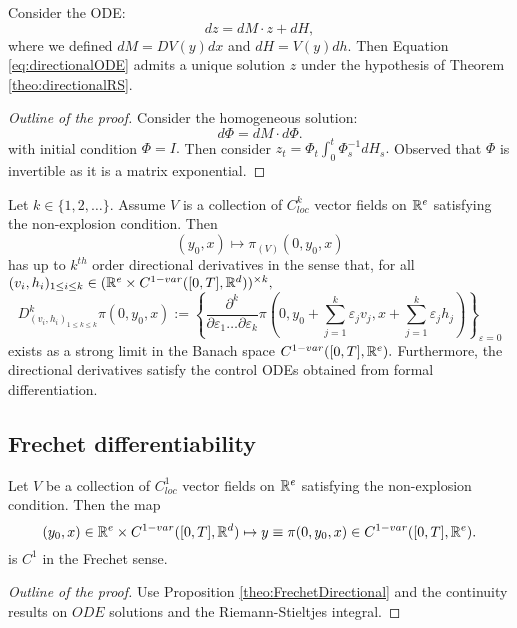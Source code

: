 \begin{proposition}
    Consider the ODE:
    \begin{equation}\label{eq:directionalODE}
        dz = dM \cdot z + dH, 
    \end{equation}
    where we defined $dM = DV(y) dx$ and $dH = V(y) dh.$
    Then Equation \eqref{eq:directionalODE} admits a unique solution $z$ under the hypothesis of Theorem \ref{theo:directionalRS}.
\end{proposition}
\begin{proof}[Outline of the proof]
    Consider the homogeneous solution:
    \begin{equation}
        d \Phi = dM \cdot d \Phi.
    \end{equation}
    with initial condition $\Phi = I.$
    Then consider $z_t = \Phi_t \int_0^t \Phi_s^{-1} dH_s.$
    Observed that $\Phi$ is invertible as it is a matrix exponential.
\end{proof}

\begin{proposition}
    Let $k \in \{ 1, 2, \ldots \}.$
    Assume $V$ is a collection of $C^k_{loc}$ vector fields on $\mathbb{R}^e$ satisfying the non-explosion condition. Then
    \begin{equation*}
        (y_0, x) \mapsto \pi_{(V)}(0, y_0, x)
    \end{equation*}
    has up to $k^{th}$ order directional derivatives in the sense that, for all $(v_i, h_i)_{1 \leq i \leq k} \in (\mathbb{R}^e \times C^{1-var}([0,T], \mathbb{R}^d))^{\times k},$
    \begin{equation*}
        D_{(v_i, h_i)_{1 \leq k \leq k}}^k \pi(0, y_0, x) := \left\{ \frac{\partial^k}{\partial \varepsilon_1 \ldots \partial \varepsilon_k} \pi \left( 0, y_0 + \sum_{j=1}^k \varepsilon_j v_j, x + \sum_{j=1}^k \varepsilon_j h_j \right) \right\}_{\varepsilon = 0}
    \end{equation*}
    exists as a strong limit in the Banach space $C^{1-var}([0,T], \mathbb{R}^e).$
    Furthermore, the directional derivatives satisfy the control ODEs obtained from formal differentiation.
\end{proposition}

\subsection{Frechet differentiability}

\begin{theorem}
    Let $V$ be a collection of $C^1_{loc}$ vector fields on $\mathbb{R}^e$ satisfying the non-explosion condition. Then the map
    \begin{equation}
        (y_0, x) \in \mathbb{R}^e \times C^{1-var}([0,T], \mathbb{R}^d) \mapsto y \equiv \pi(0, y_0, x) \in C^{1-var}([0,T], \mathbb{R}^e).
    \end{equation}
    is $C^1$ in the Frechet sense.
\end{theorem}
\begin{proof}[Outline of the proof]
    Use Proposition \ref{theo:FrechetDirectional} and the continuity results on $ODE$ solutions and the Riemann-Stieltjes integral.
\end{proof}


